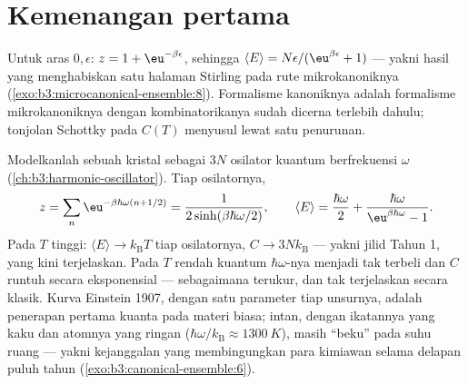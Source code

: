 \section{Kemenangan pertama}

\begin{example}\label{ex:b3:canonical-ensemble:twolevel}
Untuk aras $0, \epsilon$: $z = 1 + \eu^{-\beta\epsilon}$, sehingga
$\langle E\rangle = N\epsilon/(\eu^{\beta\epsilon} + 1)$ --- yakni hasil
yang menghabiskan satu halaman Stirling pada rute mikrokanoniknya
(\cref{exo:b3:microcanonical-ensemble:8}). Formalisme kanoniknya adalah
formalisme mikrokanoniknya dengan kombinatorikanya sudah dicerna
terlebih dahulu; tonjolan Schottky pada $C(T)$ menyusul lewat satu
penurunan.
\end{example}

\begin{example}\label{ex:b3:canonical-ensemble:einstein}
Modelkanlah sebuah kristal sebagai $3N$ osilator kuantum berfrekuensi
$\omega$ (\cref{ch:b3:harmonic-oscillator}). Tiap osilatornya,
\[
z = \sum_n\eu^{-\beta\hbar\omega(n + 1/2)}
 = \frac{1}{2\sinh(\beta\hbar\omega/2)} , \qquad
\langle E\rangle = \frac{\hbar\omega}{2} +
\frac{\hbar\omega}{\eu^{\beta\hbar\omega} - 1} .
\]
Pada $T$ tinggi: $\langle E\rangle \to k_{\text{B}}T$ tiap osilatornya,
$C \to 3Nk_{\text{B}}$ --- yakni  jilid Tahun 1, yang
kini terjelaskan. Pada $T$ rendah kuantum $\hbar\omega$-nya menjadi tak
terbeli dan $C$ runtuh secara eksponensial --- sebagaimana terukur, dan
tak terjelaskan secara klasik. Kurva Einstein 1907, dengan satu
parameter tiap unsurnya, adalah penerapan pertama kuanta pada materi
biasa; intan, dengan ikatannya yang kaku dan atomnya yang ringan
($\hbar\omega/k_{\text{B}}
\approx \qty{1300}{K}$), masih ``beku'' pada suhu ruang --- yakni
kejanggalan yang membingungkan para kimiawan selama delapan puluh tahun
(\cref{exo:b3:canonical-ensemble:6}).
\end{example}

